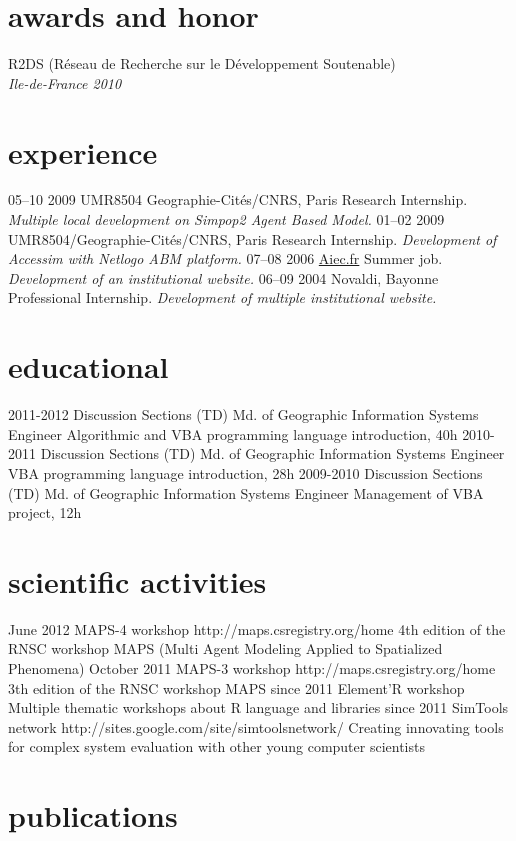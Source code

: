 \documentclass[]{friggeri-cv}
\begin{document}
\section{awards and honor}

R2DS (Réseau de Recherche sur le Développement Soutenable)\\
\emph{Ile-de-France 2010}

\section{experience}

\begin{entrylist}
  \entry
    {05–10 2009}
    {UMR8504 Geographie-Cités/CNRS, Paris}
    {Research Internship.}
    {\emph{Multiple local development on Simpop2 Agent Based Model.}}
  \entry
    {01–02 2009}
    {UMR8504/Geographie-Cités/CNRS, Paris}
    {Research Internship.}
    {\emph{Development of Accessim with Netlogo ABM platform.}}
  \entry
    {07–08 2006}
    {\href{http://www.aiec.fr}{Aiec.fr}}
    {Summer job.}
    {\emph{Development of an institutional website.}}
  \entry
    {06–09 2004}
    {Novaldi, Bayonne}
    {Professional Internship.}
    {\emph{Development of multiple institutional website.}}

\end{entrylist}

\section{educational}

\begin{entrylist}
  \entry
    {2011-2012}
    {Discussion Sections (TD)}
    {Md. of Geographic Information Systems Engineer}
    {Algorithmic and VBA programming language introduction, 40h}
  \entry
    {2010-2011}
    {Discussion Sections (TD)}
    {Md. of Geographic Information Systems Engineer}
    {VBA programming language introduction, 28h}
  \entry
    {2009-2010}
    {Discussion Sections (TD)}
    {Md. of Geographic Information Systems Engineer}
    {Management of VBA project, 12h}
\end{entrylist}

\section{scientific activities}

\begin{entrylist}
  \entry
    {June 2012}
    {MAPS-4 workshop}
    {http://maps.csregistry.org/home}
    {4th edition of the RNSC workshop MAPS (Multi Agent Modeling Applied to Spatialized Phenomena)}
  \entry
    {October 2011}
    {MAPS-3 workshop}
    {http://maps.csregistry.org/home}
    {3th edition of the RNSC workshop MAPS}
  \entry
    {since 2011}
    {Element'R workshop}
    {}
    {Multiple thematic workshops about R language and libraries}
  \entry
    {since 2011}
    {SimTools network}
    {http://sites.google.com/site/simtoolsnetwork/}
    {Creating innovating tools for complex system evaluation with other young computer scientists}
\end{entrylist}

\section{publications}
\end{document}
